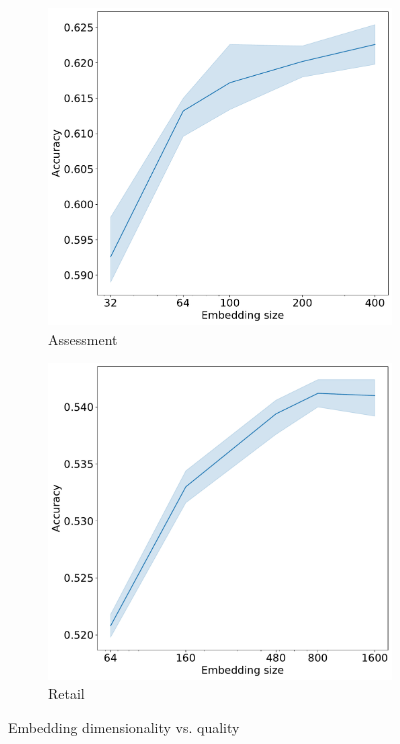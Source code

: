 \documentclass[sigconf, anonymous]{acmart}
\begin{document}
\begin{figure}
\begin{subfigure}{0.25\linewidth}
  \end{subfigure}%
  \begin{subfigure}{0.25\linewidth}
    \caption{Assessment}
    \includegraphics[width=\linewidth]{figures/hidden_size_bowl2019.pdf}
  \end{subfigure}%
  \begin{subfigure}{0.25\linewidth}
    \caption{Retail}
    \includegraphics[width=\linewidth]{figures/hidden_size_x5.pdf}
  \end{subfigure}
  \caption{Embedding dimensionality vs. quality}
  \label{fig-emb-dim}
\end{figure}
\end{document}
